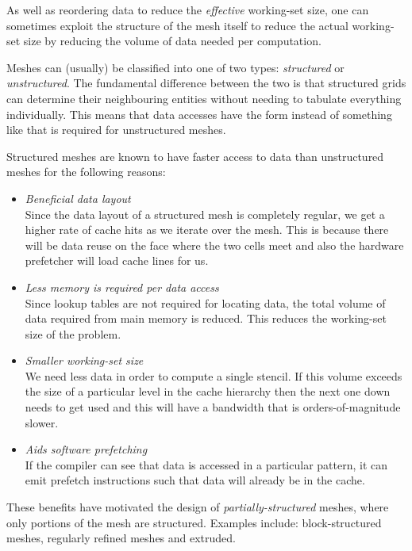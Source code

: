 As well as reordering data to reduce the \textit{effective} working-set size, one can sometimes exploit the structure of the mesh itself to reduce the actual working-set size by reducing the volume of data needed per computation.

Meshes can (usually) be classified into one of two types: \textit{structured} or \textit{unstructured}.
The fundamental difference between the two is that structured grids can determine their neighbouring entities without needing to tabulate everything individually.
This means that data accesses have the form  instead of something like  that is required for unstructured meshes.

Structured meshes are known to have faster access to data than unstructured meshes for the following reasons:

\begin{itemize}
  \item
    \textit{Beneficial data layout} \\
    Since the data layout of a structured mesh is completely regular, we get a higher rate of cache hits as we iterate over the mesh.
    This is because there will be data reuse on the face where the two cells meet and also the hardware prefetcher will load cache lines for us.

  \item
    \textit{Less memory is required per data access} \\
    Since lookup tables are not required for locating data, the total volume of data required from main memory is reduced.
    This reduces the working-set size of the problem.

  \item
    \textit{Smaller working-set size} \\
    We need less data in order to compute a single stencil.
    If this volume exceeds the size of a particular level in the cache hierarchy then the next one down needs to get used and this will have a bandwidth that is orders-of-magnitude slower.

  \item
    \textit{Aids software prefetching} \\
    If the compiler can see that data is accessed in a particular pattern, it can emit prefetch instructions such that data will already be in the cache.
\end{itemize}

These benefits have motivated the design of \textit{partially-structured} meshes, where only portions of the mesh are structured.
Examples include: block-structured meshes, regularly refined meshes and extruded.

